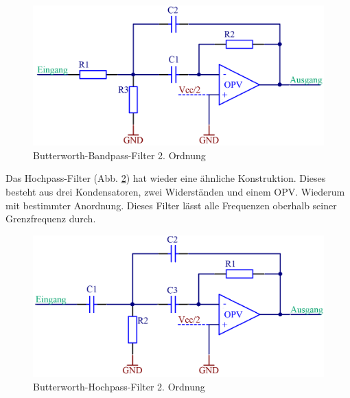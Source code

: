 \begin{figure} [H]
	\centering
	\includegraphics[width=1\textwidth]{img/Print4/BPFilter-Butterworth2Ordnung.PNG}
	\caption{Butterworth-Bandpass-Filter 2. Ordnung}
	\label {fig:8.4.1.2}
\end{figure}
Das Hochpass-Filter (Abb. \ref{fig:8.4.1.3}) hat wieder eine ähnliche Konstruktion.
Dieses besteht aus drei Kondensatoren, zwei Widerständen und einem OPV.
Wiederum mit bestimmter Anordnung.
Dieses Filter lässt alle Frequenzen oberhalb seiner Grenzfrequenz durch.
\begin{figure} [H]
	\centering	
	\includegraphics[width=1\textwidth]{img/Print4/HPFilter-Butterworth2Ordnung.PNG}
	\caption{Butterworth-Hochpass-Filter 2. Ordnung}
	\label {fig:8.4.1.3}
\end{figure}

